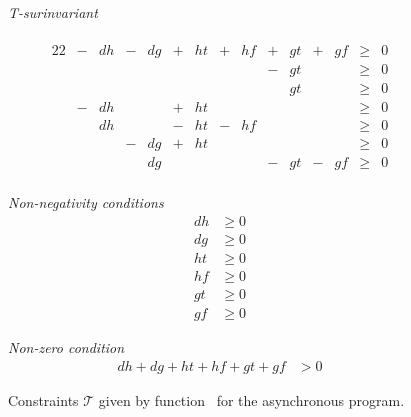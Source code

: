 \begin{figure}
  \begin{minipage}{.79\columnwidth}
    \emph{T-surinvariant} \\ \\[-2em]
    \begin{alignat*}{22}
    &{}-{}& dh &{}-{}& dg &{}+{}& ht &{}+{}& hf &{}+{}& gt &{}+{}& gf &{}\ge{}& 0 \\[-0.1cm]
    &     &    &     &    &     &    &     &    &{}-{}& gt &     &    &{}\ge{}& 0 \\[-0.1cm]
    &     &    &     &    &     &    &     &    &     & gt &     &    &{}\ge{}& 0 \\[-0.1cm]
    &{}-{}& dh &     &    &{}+{}& ht &     &    &     &    &     &    &{}\ge{}& 0 \\[-0.1cm]
    &     & dh &     &    &{}-{}& ht &{}-{}& hf &     &    &     &    &{}\ge{}& 0 \\[-0.1cm]
    &     &    &{}-{}& dg &{}+{}& ht &     &    &     &    &     &    &{}\ge{}& 0 \\[-0.1cm]
    &     &    &     & dg &     &    &     &    &{}-{}& gt &{}-{}& gf &{}\ge{}& 0 \\[-0.1cm]
    \end{alignat*}
  \end{minipage}
  \begin{minipage}{.19\columnwidth}
    \emph{Non-negativity conditions} \\[-2em]
    \begin{align*}
         dh   & \ge 0 \\[-0.1cm]
         dg   & \ge 0 \\[-0.1cm]
         ht   & \ge 0 \\[-0.1cm]
         hf   & \ge 0 \\[-0.1cm]
         gt   & \ge 0 \\[-0.1cm]
         gf   & \ge 0
    \end{align*}
  \end{minipage}
    \emph{Non-zero condition} \\[-2em]
    \begin{align*}
         dh + dg + ht + hf + gt + gf  & > 0
    \end{align*}
  \caption{Constraints $\mathcal{T}$ given by function \liveness\ for
      the asynchronous program.}
\label{fig:setT}
\end{figure}
